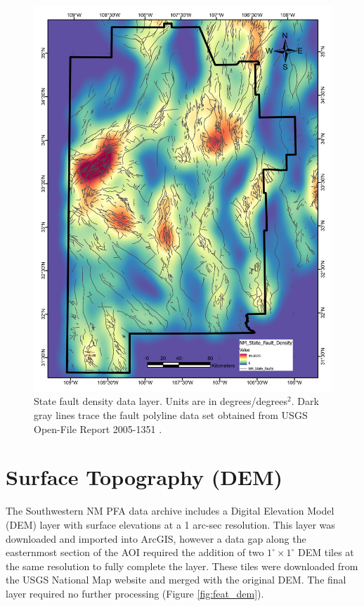 \begin{figure}[H]
\centering
\includegraphics[width=0.75\linewidth]{templates/images/Figure-StateFaultDensity.pdf}
\caption[State fault density data layer]{State fault density data layer. Units are in degrees/degrees$^2$. Dark gray lines trace the fault polyline data set obtained from USGS Open-File Report 2005-1351 \protect\citep{stoeser_usgs_2005}.}
\label{fig:state_faults}
\end{figure}
\pagebreak

\section{Surface Topography (DEM)}\label{app:dl_dem}
The Southwestern NM PFA data archive \citep{kelley_geothermal_2015} includes a Digital Elevation Model (DEM) layer with surface elevations at a 1 arc-sec resolution. This layer was downloaded and imported into ArcGIS, however a data gap along the easternmost section of the AOI required the addition of two \(1^\circ\times1^\circ\) DEM tiles at the same resolution to fully complete the layer. These tiles were downloaded from the USGS National Map website \citep{usgs_tnm_2021} and merged with the original DEM. The final layer required no further processing (Figure \ref{fig:feat_dem}).
\vfill
\pagebreak

